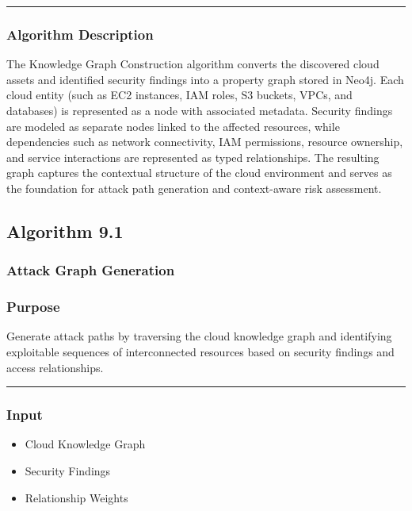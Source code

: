\begin{center}\rule{0.5\linewidth}{0.5pt}\end{center}

\subsubsection{Algorithm Description}

The Knowledge Graph Construction algorithm converts the discovered cloud assets and identified security findings into a property graph stored in Neo4j. Each cloud entity (such as EC2 instances, IAM roles, S3 buckets, VPCs, and databases) is represented as a node with associated metadata. Security findings are modeled as separate nodes linked to the affected resources, while dependencies such as network connectivity, IAM permissions, resource ownership, and service interactions are represented as typed relationships. The resulting graph captures the contextual structure of the cloud environment and serves as the foundation for attack path generation and context-aware risk assessment.

\subsection{Algorithm 9.1}

\subsubsection{Attack Graph Generation}

\subsubsection{\texorpdfstring{\textbf{Purpose}}{Purpose}}

Generate attack paths by traversing the cloud knowledge graph and identifying exploitable sequences of interconnected resources based on security findings and access relationships.

\begin{center}\rule{0.5\linewidth}{0.5pt}\end{center}

\subsubsection{\texorpdfstring{\textbf{Input}}{Input}}

\begin{itemize}
\tightlist
\item
  Cloud Knowledge Graph\\
\item
  Security Findings\\
\item
  Relationship Weights
\end{itemize}


